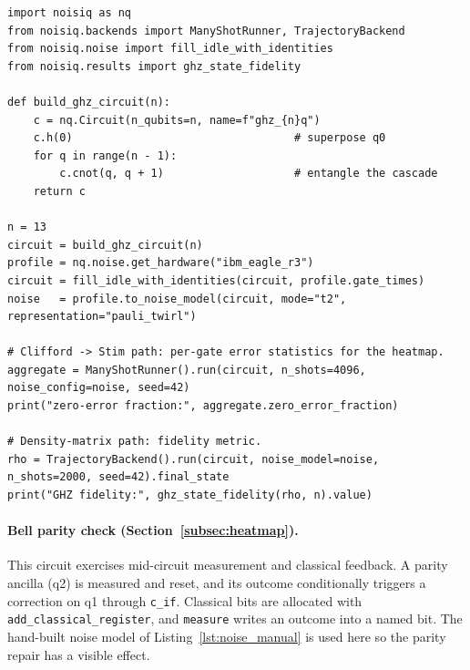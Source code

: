 \documentclass[10pt,twocolumn]{article}
\begin{document}
\begin{lstlisting}[style=noisiqpython, caption={Building and running the
$N$-qubit GHZ example. The Clifford circuit is sent to Stim via
\texttt{ManyShotRunner} for error statistics; \texttt{TrajectoryBackend}
provides the density matrix for the reported metrics.}, label={lst:ghz}]
import noisiq as nq
from noisiq.backends import ManyShotRunner, TrajectoryBackend
from noisiq.noise import fill_idle_with_identities
from noisiq.results import ghz_state_fidelity
 
def build_ghz_circuit(n):
    c = nq.Circuit(n_qubits=n, name=f"ghz_{n}q")
    c.h(0)                                  # superpose q0
    for q in range(n - 1):
        c.cnot(q, q + 1)                    # entangle the cascade
    return c
 
n = 13
circuit = build_ghz_circuit(n)
profile = nq.noise.get_hardware("ibm_eagle_r3")
circuit = fill_idle_with_identities(circuit, profile.gate_times)
noise   = profile.to_noise_model(circuit, mode="t2", representation="pauli_twirl")
 
# Clifford -> Stim path: per-gate error statistics for the heatmap.
aggregate = ManyShotRunner().run(circuit, n_shots=4096, noise_config=noise, seed=42)
print("zero-error fraction:", aggregate.zero_error_fraction)
 
# Density-matrix path: fidelity metric.
rho = TrajectoryBackend().run(circuit, noise_model=noise, n_shots=2000, seed=42).final_state
print("GHZ fidelity:", ghz_state_fidelity(rho, n).value)
\end{lstlisting}
 
\paragraph{Bell parity check (Section~\ref{subsec:heatmap}).}
This circuit exercises mid-circuit measurement and classical feedback. A
parity ancilla (q2) is measured and reset, and its outcome conditionally
triggers a correction on q1 through \texttt{c\_if}. Classical bits are
allocated with \texttt{add\_classical\_register}, and \texttt{measure} writes
an outcome into a named bit. The hand-built noise model of
Listing~\ref{lst:noise_manual} is used here so the parity repair has a visible
effect.
 
\end{document}
